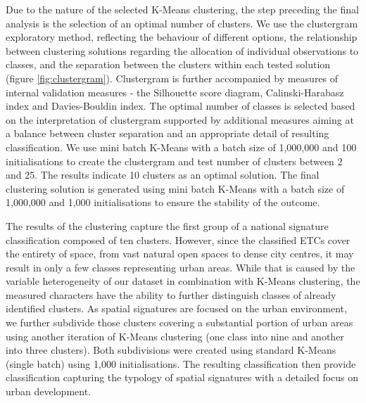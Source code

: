\documentclass[fleqn,10pt]{wlscirep}
\begin{document}
Due to the nature of the selected K-Means clustering, the step preceding the final
analysis is the selection of an optimal number of clusters. We use the
clustergram exploratory method\cite{schonlau2002clustergram}, reflecting the behaviour of different options, the relationship
between clustering solutions regarding the allocation of individual observations to
classes, and the separation between the clusters within each tested solution (figure \ref{fig:clustergram}).
Clustergram is further accompanied by measures of internal validation measures - the
Silhouette score diagram, Calinski-Harabasz index\cite{calinski1974} and Davies-Bouldin index\cite{davies1979cluster}. The optimal
number of classes is selected based on the interpretation of clustergram supported by
additional measures aiming at a balance between cluster separation and an appropriate
detail of resulting classification. We use mini batch K-Means with a batch size of 1,000,000
and 100 initialisations to create the clustergram and test number of clusters between 2 and
25. The results indicate 10 clusters as an optimal solution. The final clustering solution
is generated using mini batch K-Means with a batch size of 1,000,000 and 1,000 initialisations
to ensure the stability of the outcome.

The results of the clustering capture the first group of a national signature
classification composed of ten clusters. However, since the classified ETCs
cover the entirety of space, from vast
natural open spaces to dense city centres, it may result in only a few classes
representing urban areas. While that is caused by the variable heterogeneity of our
dataset in combination with K-Means clustering, the measured characters have the ability
to further distinguish classes of already identified clusters. As spatial signatures
are focused on the urban environment, we further subdivide those clusters covering
a substantial portion of urban areas using another iteration of K-Means clustering
(one class into nine and another into three clusters). Both subdivisions were created using
standard K-Means (single batch) using 1,000 initialisations.
The resulting classification then provide classification capturing the typology of
spatial signatures with a detailed focus on urban development.
\end{document}
